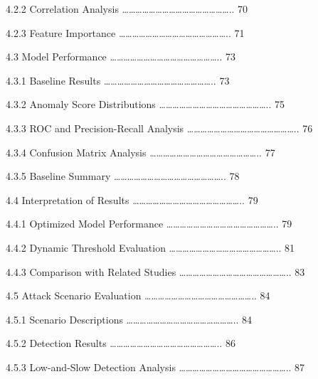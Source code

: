 \documentclass[
  a4paper]{report}
\begin{document}
4.2.2 Correlation Analysis
\ldots\ldots\ldots\ldots\ldots\ldots\ldots\ldots\ldots\ldots\ldots\ldots\ldots\ldots\ldots\ldots..
70

4.2.3 Feature Importance
\ldots\ldots\ldots\ldots\ldots\ldots\ldots\ldots\ldots\ldots\ldots\ldots\ldots\ldots\ldots\ldots..
71

4.3 Model Performance
\ldots\ldots\ldots\ldots\ldots\ldots\ldots\ldots\ldots\ldots\ldots\ldots\ldots\ldots\ldots\ldots..
73

4.3.1 Baseline Results
\ldots\ldots\ldots\ldots\ldots\ldots\ldots\ldots\ldots\ldots\ldots\ldots\ldots\ldots\ldots\ldots..
73

4.3.2 Anomaly Score Distributions
\ldots\ldots\ldots\ldots\ldots\ldots\ldots\ldots\ldots\ldots\ldots\ldots\ldots\ldots\ldots\ldots..
75

4.3.3 ROC and Precision-Recall Analysis
\ldots\ldots\ldots\ldots\ldots\ldots\ldots\ldots\ldots\ldots\ldots\ldots\ldots\ldots\ldots\ldots..
76

4.3.4 Confusion Matrix Analysis
\ldots\ldots\ldots\ldots\ldots\ldots\ldots\ldots\ldots\ldots\ldots\ldots\ldots\ldots\ldots\ldots..
77

4.3.5 Baseline Summary
\ldots\ldots\ldots\ldots\ldots\ldots\ldots\ldots\ldots\ldots\ldots\ldots\ldots\ldots\ldots\ldots..
78

4.4 Interpretation of Results
\ldots\ldots\ldots\ldots\ldots\ldots\ldots\ldots\ldots\ldots\ldots\ldots\ldots\ldots\ldots\ldots..
79

4.4.1 Optimized Model Performance
\ldots\ldots\ldots\ldots\ldots\ldots\ldots\ldots\ldots\ldots\ldots\ldots\ldots\ldots\ldots\ldots..
79

4.4.2 Dynamic Threshold Evaluation
\ldots\ldots\ldots\ldots\ldots\ldots\ldots\ldots\ldots\ldots\ldots\ldots\ldots\ldots\ldots\ldots..
81

4.4.3 Comparison with Related Studies
\ldots\ldots\ldots\ldots\ldots\ldots\ldots\ldots\ldots\ldots\ldots\ldots\ldots\ldots\ldots\ldots..
83

4.5 Attack Scenario Evaluation
\ldots\ldots\ldots\ldots\ldots\ldots\ldots\ldots\ldots\ldots\ldots\ldots\ldots\ldots\ldots\ldots..
84

4.5.1 Scenario Descriptions
\ldots\ldots\ldots\ldots\ldots\ldots\ldots\ldots\ldots\ldots\ldots\ldots\ldots\ldots\ldots\ldots..
84

4.5.2 Detection Results
\ldots\ldots\ldots\ldots\ldots\ldots\ldots\ldots\ldots\ldots\ldots\ldots\ldots\ldots\ldots\ldots..
86

4.5.3 Low-and-Slow Detection Analysis
\ldots\ldots\ldots\ldots\ldots\ldots\ldots\ldots\ldots\ldots\ldots\ldots\ldots\ldots\ldots\ldots..
87
\end{document}
